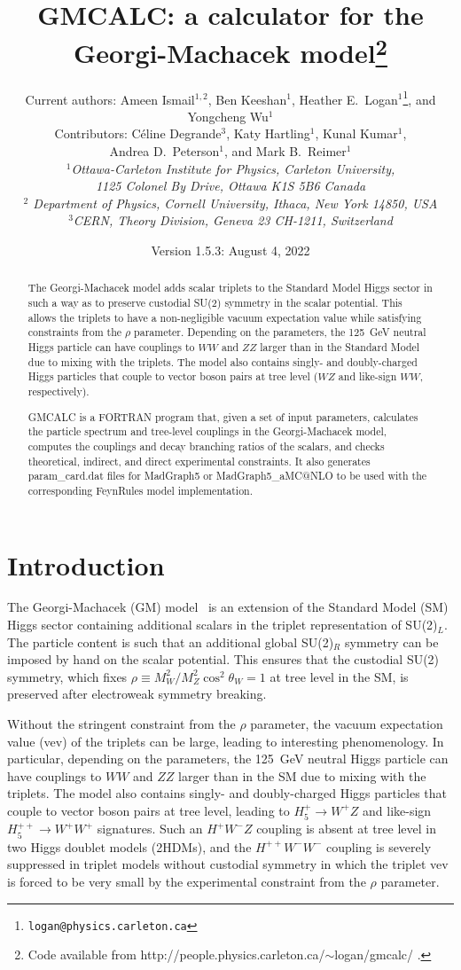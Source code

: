 \documentclass[11pt]{article}
\title{\bf GMCALC: a calculator for the Georgi-Machacek model\footnote{Code available from http://people.physics.carleton.ca/$\sim$logan/gmcalc/ .}}
\author{Current authors: Ameen Ismail$^{1,2}$, Ben Keeshan$^1$, Heather E.\ Logan$^1$\thanks{\tt logan@physics.carleton.ca}, and Yongcheng Wu$^1$ \\
Contributors: C\'eline Degrande$^3$, Katy Hartling$^1$,  Kunal Kumar$^1$, \\
Andrea D.\ Peterson$^1$, and Mark B.\ Reimer$^1$ \\
{\it $^1$Ottawa-Carleton Institute for Physics, Carleton University,} \\ 
{\it 1125 Colonel By Drive, Ottawa K1S 5B6 Canada}\\
{\it $^2$ Department of Physics, Cornell University, Ithaca, New York 14850, USA} \\
{\it $^3$CERN, Theory Division, Geneva 23 CH-1211, Switzerland} }
\date{Version 1.5.3: August 4, 2022}
\begin{document}
\maketitle

\begin{abstract}
The Georgi-Machacek model adds scalar triplets to the Standard Model Higgs sector in such a way as to preserve custodial SU(2) symmetry in the scalar potential. This allows the triplets to have a non-negligible vacuum expectation value while satisfying constraints from the $\rho$ parameter. Depending on the parameters, the 125~GeV neutral Higgs particle can have couplings to $WW$ and $ZZ$ larger than in the Standard Model due to mixing with the triplets. The model also contains singly- and doubly-charged Higgs particles that couple to vector boson pairs at tree level ($WZ$ and like-sign $WW$, respectively).

GMCALC is a FORTRAN program that, given a set of input parameters, calculates the particle spectrum and tree-level couplings in the Georgi-Machacek model, computes the couplings and decay branching ratios of the scalars, and checks theoretical, indirect, and direct experimental constraints. It also generates param\_card.dat files for MadGraph5 or MadGraph5\_aMC@NLO to be used with the corresponding FeynRules model implementation. 
\end{abstract}

\newpage
\tableofcontents
\newpage

\section{Introduction}

The Georgi-Machacek (GM) model~\cite{Georgi:1985nv,Chanowitz:1985ug} is an extension of the Standard Model (SM) Higgs sector containing additional scalars in the triplet representation of SU(2)$_L$.  The particle content is such that an additional global SU(2)$_R$ symmetry can be imposed by hand on the scalar potential.  This ensures that the custodial SU(2) symmetry, which fixes $\rho \equiv M_W^2/M_Z^2 \cos^2\theta_W = 1$ at tree level in the SM, is preserved after electroweak symmetry breaking.  

Without the stringent constraint from the $\rho$ parameter, the vacuum expectation value (vev) of the triplets can be large, leading to interesting phenomenology.  In particular, depending on the parameters, the 125~GeV neutral Higgs particle can have couplings to $WW$ and $ZZ$ larger than in the SM due to mixing with the triplets. The model also contains singly- and doubly-charged Higgs particles that couple to vector boson pairs at tree level, leading to $H_5^+ \to W^+Z$ and like-sign $H_5^{++} \to W^+ W^+$ signatures.  Such an $H^+ W^- Z$ coupling is absent at tree level in two Higgs doublet models (2HDMs), and the $H^{++} W^- W^-$ coupling is severely suppressed in triplet models without custodial symmetry in which the triplet vev is forced to be very small by the experimental constraint from the $\rho$ parameter.
\end{document}
